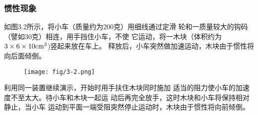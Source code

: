 \subsubsection{惯性现象}
如图3.2所示，将小车（质量约为200克）用细线通过定滑
轮和一质量较大的钩码（譬如30克）相连，用手挡住小车，不使
它运动，将一木块（体积约为$3\times6\times10{\rm cm^3}$)竖起来放在车上。
释放后，小车突然做加速运动，木块由于惯性将向后面倾倒。
\begin{figure}[htp]
    \centering
    \texttt{[image: fig/3-2.png]}
    \caption{}
\end{figure}

利用同一装置继续演示，开始时用手扶住木块同时施加
适当的阻力使小车的加速度不至太大。待小车和木块一起运
动后再完全放手，这时木块和小车将保持相对静止，当小车
运动到平面一端受阻突然停止运动时，木块由于惯性将向前倾倒。



